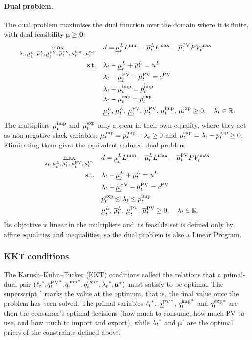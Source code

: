 \paragraph{Dual problem.}
The dual problem maximises the dual function over the domain where it is finite, with dual
feasibility $\boldsymbol{\mu} \geq \mathbf{0}$:
\begin{align}
    \max_{\lbal,\, \muLlo,\, \muLup,\, \muPVlo,\, \muPVup,\, \muimp,\, \muexp} \quad
    & d = \muLlo \Lmin - \muLup \Lmax - \muPVup \PVmax \\
    \text{s.t.} \quad
    & \lbal - \muLlo + \muLup = \uL \\
    & \lbal + \muPVlo - \muPVup = \cpv \\
    & \lbal + \muimp = \pimp \\
    & \lbal - \muexp = \pexp \\
    & \muLlo,\, \muLup,\, \muPVlo,\, \muPVup,\, \muimp,\, \muexp \geq 0, \quad
      \lbal \in \mathbb{R}.
\end{align}
The multipliers $\muimp$ and $\muexp$ only appear in their own equality, where they act as
non-negative slack variables: $\muimp = \pimp - \lbal \geq 0$ and $\muexp = \lbal - \pexp
\geq 0$. Eliminating them gives the equivalent reduced dual problem
\begin{align}
    \max_{\lbal,\, \muLlo,\, \muLup,\, \muPVlo,\, \muPVup} \quad
    & d = \muLlo \Lmin - \muLup \Lmax - \muPVup \PVmax \label{eq:dual_reduced} \\
    \text{s.t.} \quad
    & \lbal - \muLlo + \muLup = \uL \\
    & \lbal + \muPVlo - \muPVup = \cpv \\
    & \pexp \leq \lbal \leq \pimp \label{eq:dual_lambda_bounds} \\
    & \muLlo,\, \muLup,\, \muPVlo,\, \muPVup \geq 0, \quad \lbal \in \mathbb{R}.
\end{align}
Its objective is linear in the multipliers and its feasible set is defined only by affine
equalities and inequalities, so the dual problem is also a Linear Program.

\subsubsection{KKT conditions}
The Karush--Kuhn--Tucker (KKT) conditions collect the relations that a primal-dual pair
$({\load}^*, {\pvprod}^*, {\qimp}^*, {\qexp}^*, {\lbal}^*, \boldsymbol{\mu}^*)$ must satisfy to be
optimal. The superscript $^*$ marks the value at the optimum, that is, the final value once the problem has been solved. The primal variables ${\load}^*$, ${\pvprod}^*$, ${\qimp}^*$ and
${\qexp}^*$ are then the consumer's optimal decisions (how much to consume, how much PV to use, and how much to import and export), while ${\lbal}^*$ and $\boldsymbol{\mu}^*$ are the optimal
prices of the constraints defined above. 

